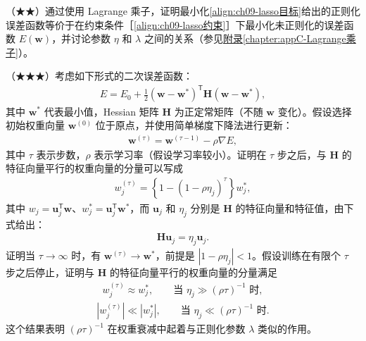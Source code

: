 \documentclass[../../main.tex]{subfiles}
\begin{document}
\begin{exercise}\label{exercise:ch09-05}
（★★）通过使用 Lagrange 乘子，证明最小化\eqref{align:ch09-lasso目标}给出的正则化误差函数等价于在约束条件［\eqref{align:ch09-lasso约束}］下最小化未正则化的误差函数 $E(\boldsymbol{w})$，并讨论参数 $\eta$ 和 $\lambda$ 之间的关系（参见\hyperref[chapter:appC-Lagrange乘子]{附录\ref*{chapter:appC-Lagrange乘子}}）。
\end{exercise}

\begin{exercise}\label{exercise:ch09-06}
（★★★）考虑如下形式的二次误差函数：
\begin{align}
E=E_{0}+\frac{1}{2}(\boldsymbol{w}-\boldsymbol{w}^{*})^{\mathsf T}\boldsymbol{H}(\boldsymbol{w}-\boldsymbol{w}^{*}),
\label{align:ch09-二次误差}
\end{align}
其中 $\boldsymbol{w}^{*}$ 代表最小值，Hessian 矩阵 $\boldsymbol{H}$ 为正定常矩阵（不随 $\boldsymbol{w}$ 变化）。假设选择初始权重向量 $\boldsymbol{w}^{(0)}$ 位于原点，并使用简单梯度下降法进行更新：
\begin{align}
\boldsymbol{w}^{(\tau)}=\boldsymbol{w}^{(\tau-1)}-\rho\nabla E,
\label{align:ch09-简单梯度下降}
\end{align}
其中 $\tau$ 表示步数，$\rho$ 表示学习率（假设学习率较小）。证明在 $\tau$ 步之后，与 $\boldsymbol{H}$ 的特征向量平行的权重向量的分量可以写成
\begin{align}
w_{j}^{(\tau)}=\left\{1-(1-\rho\eta_{j})^{\tau}\right\}w_{j}^{*},
\label{align:ch09-早停分量}
\end{align}
其中 $w_{j}=\boldsymbol{u}_{j}^{\mathsf T}\boldsymbol{w}$、$w_{j}^{*}=\boldsymbol{u}_{j}^{\mathsf T}\boldsymbol{w}^{*}$，而 $\boldsymbol{u}_{j}$ 和 $\eta_{j}$ 分别是 $\boldsymbol{H}$ 的特征向量和特征值，由下式给出：
\begin{align}
\boldsymbol{H}\boldsymbol{u}_{j}=\eta_{j}\boldsymbol{u}_{j}.
\label{align:ch09-特征方程}
\end{align}
证明当 $\tau\to\infty$ 时，有 $\boldsymbol{w}^{(\tau)}\to\boldsymbol{w}^{*}$，前提是 $|1-\rho\eta_{j}|<1$。假设训练在有限个 $\tau$ 步之后停止，证明与 $\boldsymbol{H}$ 的特征向量平行的权重向量的分量满足
\begin{align}
w_{j}^{(\tau)}\approx w_{j}^{*},\qquad\text{当 }\eta_{j}\gg(\rho\tau)^{-1}\text{ 时},
\label{align:ch09-早停大特征值}
\end{align}
\begin{align}
|w_{j}^{(\tau)}|\ll|w_{j}^{*}|,\qquad\text{当 }\eta_{j}\ll(\rho\tau)^{-1}\text{ 时}.
\label{align:ch09-早停小特征值}
\end{align}
这个结果表明 $(\rho\tau)^{-1}$ 在权重衰减中起着与正则化参数 $\lambda$ 类似的作用。
\end{exercise}
\end{document}
